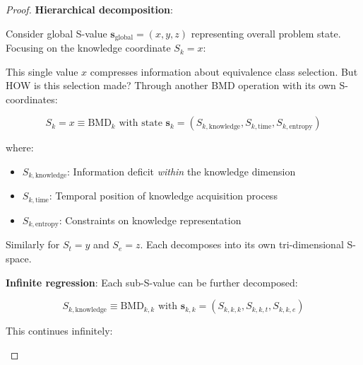 \documentclass[12pt,a4paper]{article}
\begin{document}
\begin{proof}
\textbf{Hierarchical decomposition}:

Consider global S-value $\mathbf{s}_{\text{global}} = (x, y, z)$ representing overall problem state. Focusing on the knowledge coordinate $S_k = x$:

This single value $x$ compresses information about equivalence class selection. But HOW is this selection made? Through another BMD operation with its own S-coordinates:

\begin{equation}
S_k = x \equiv \text{BMD}_k \text{ with state } \mathbf{s}_k = (S_{k,\text{knowledge}}, S_{k,\text{time}}, S_{k,\text{entropy}})
\end{equation}

where:
\begin{itemize}
\item $S_{k,\text{knowledge}}$: Information deficit \textit{within} the knowledge dimension
\item $S_{k,\text{time}}$: Temporal position of knowledge acquisition process
\item $S_{k,\text{entropy}}$: Constraints on knowledge representation
\end{itemize}

Similarly for $S_t = y$ and $S_e = z$. Each decomposes into its own tri-dimensional S-space.

\textbf{Infinite regression}: Each sub-S-value can be further decomposed:

\begin{equation}
S_{k,\text{knowledge}} \equiv \text{BMD}_{k,k} \text{ with } \mathbf{s}_{k,k} = (S_{k,k,k}, S_{k,k,t}, S_{k,k,e})
\end{equation}

This continues infinitely:

\begin{center}
\end{center}


\end{proof}
\end{document}

